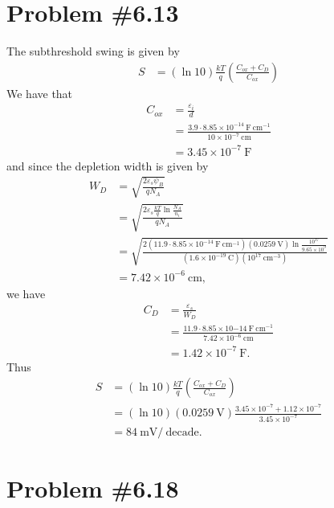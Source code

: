 \documentclass{article}
\begin{document}
\pagebreak

\section*{Problem \#6.13}
The subthreshold swing is given by
\begin{align*}
S &= (\ln 10) \frac{kT}{q} \left(\frac{C_{ox} + C_D}{C_{ox}}\right) 
\end{align*}
We have that
\begin{align*}
C_{ox} &= \frac{\varepsilon_i}{d} \\
       &= \frac{3.9 \cdot 8.85 \times 10^{-14} ~\mathrm{F}~\mathrm{cm}^{-1}}
               {10 \times 10^{-7} ~\mathrm{cm}} \\
       &= 3.45 \times 10^{-7} ~\mathrm{F}
\end{align*}
and since the depletion width is given by
\begin{align*}
W_D &= \sqrt{\frac{2\varepsilon_s \psi_B}{qN_A}} \\
    &= \sqrt{\frac{2\varepsilon_s \frac{kT}{q} \ln \frac{N_A}{n_i}}{qN_A}} \\
    &= \sqrt{\frac{2(11.9 \cdot 8.85 \times 10^{-14} ~\mathrm{F}~\mathrm{cm}^{-1})
                    (0.0259 ~\mathrm{V})\ln\frac{10^{17}}{9.65 \times 10^9}}
                  {(1.6 \times 10^{-19} ~\mathrm{C})
                   (10^{17} ~\mathrm{cm}^{-3})}} \\
    &= 7.42 \times 10^{-6} ~\mathrm{cm},
\end{align*}
we have
\begin{align*}
C_D &= \frac{\varepsilon_s}{W_D} \\
    &= \frac{11.9 \cdot 8.85 \times 10{-14} ~\mathrm{F}~\mathrm{cm}^{-1}}
            {7.42 \times 10^{-6} ~\mathrm{cm}} \\
    &= 1.42 \times 10^{-7} ~\mathrm{F}.
\end{align*}
Thus
\begin{align*}
S &= (\ln 10) \frac{kT}{q} \left(\frac{C_{ox} + C_D}{C_{ox}}\right) \\
  &= (\ln 10) (0.0259 ~\mathrm{V}) \frac{3.45 \times 10^{-7} + 1.12 \times 10^{-7}}{3.45 \times 10^{-7}} \\
  &= 84 ~\mathrm{mV}/~\mathrm{decade}.
\end{align*}


\section*{Problem \#6.18}
\end{document}
